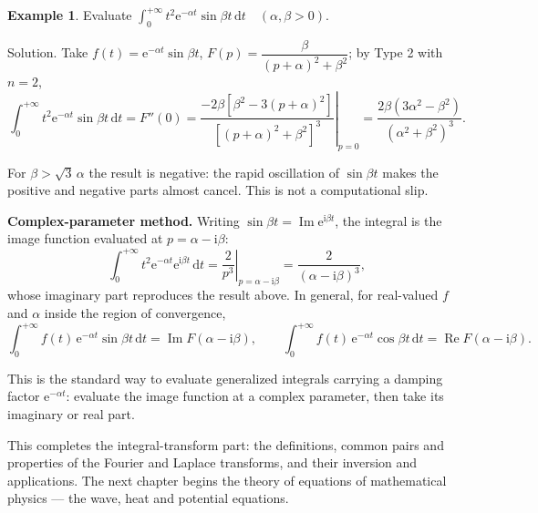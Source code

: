 \documentclass[11pt,a4paper]{article}
\theoremstyle{definition}
\newtheorem{example}{Example}[section]
\theoremstyle{plain}
\begin{document}
\begin{example}
Evaluate
$\displaystyle\int_{0}^{+\infty}t^{2}\mathrm{e}^{-\alpha t}\sin\beta t\,\mathrm{d}t
\quad(\alpha,\beta>0)$.
\end{example}

Solution. Take $f(t)=\mathrm{e}^{-\alpha t}\sin\beta t$,
$F(p)=\dfrac{\beta}{(p+\alpha)^2+\beta^2}$; by Type 2 with $n=2$,
\begin{equation*}
\int_{0}^{+\infty}t^{2}\mathrm{e}^{-\alpha t}\sin\beta t\,\mathrm{d}t=F''(0)
=\left.\frac{-2\beta\left[\beta^2-3(p+\alpha)^2\right]}
{\left[(p+\alpha)^2+\beta^2\right]^3}\right|_{p=0}
=\frac{2\beta\left(3\alpha^2-\beta^2\right)}{\left(\alpha^2+\beta^2\right)^3} .
\end{equation*}

For $\beta>\sqrt{3}\,\alpha$ the result is negative: the rapid oscillation of $\sin\beta t$ makes
the positive and negative parts almost cancel. This is not a computational slip.

\textbf{Complex-parameter method.} Writing $\sin\beta t=\operatorname{Im}\mathrm{e}^{\mathrm{i}\beta t}$,
the integral is the image function evaluated at $p=\alpha-\mathrm{i}\beta$:
\begin{equation*}
\int_{0}^{+\infty}t^{2}\mathrm{e}^{-\alpha t}\mathrm{e}^{\mathrm{i}\beta t}\,\mathrm{d}t
=\left.\frac{2}{p^{3}}\right|_{p=\alpha-\mathrm{i}\beta}
=\frac{2}{(\alpha-\mathrm{i}\beta)^{3}},
\end{equation*}
whose imaginary part reproduces the result above. In general, for real-valued $f$ and $\alpha$
inside the region of convergence,
\begin{equation*}
\int_{0}^{+\infty}f(t)\,\mathrm{e}^{-\alpha t}\sin\beta t\,\mathrm{d}t
=\operatorname{Im}F(\alpha-\mathrm{i}\beta),\qquad
\int_{0}^{+\infty}f(t)\,\mathrm{e}^{-\alpha t}\cos\beta t\,\mathrm{d}t
=\operatorname{Re}F(\alpha-\mathrm{i}\beta).
\end{equation*}

This is the standard way to evaluate generalized integrals carrying a damping factor
$\mathrm{e}^{-\alpha t}$: evaluate the image function at a complex parameter, then take its
imaginary or real part.

This completes the integral-transform part: the definitions, common pairs and properties of the
Fourier and Laplace transforms, and their inversion and applications. The next chapter begins the
theory of equations of mathematical physics --- the wave, heat and potential equations.
\end{document}
